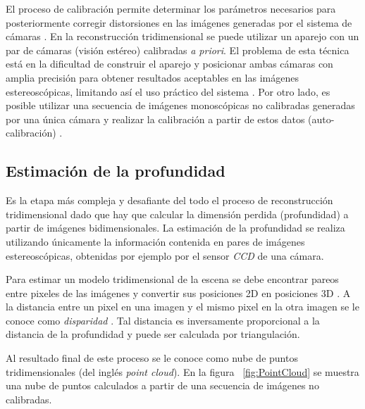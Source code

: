 El proceso de calibraci\'{o}n permite determinar los par\'{a}metros necesarios para posteriormente corregir distorsiones en las im\'{a}genes generadas por el sistema de c\'{a}maras \cite{Bradski_Kaehler_2008,Shah_1983,Szeliski_2010, Tsai_R_Y_1987}. En la reconstrucci\'{o}n tridimensional se puede utilizar un aparejo con un par de c\'{a}maras (visi\'{o}n est\'{e}reo) calibradas \textit{a priori}. El problema de esta t\'{e}cnica est\'{a} en la dificultad de construir el aparejo y posicionar ambas c\'{a}maras con amplia precisi\'{o}n para obtener resultados aceptables en las im\'{a}genes estereosc\'{o}picas, limitando as\'{i} el uso pr\'{a}ctico del sistema \cite{Faugeras_Toscani_1986, Faugeras_Luong_2001, Faugeras_1993}. Por otro lado, es posible utilizar una secuencia de im\'{a}genes monosc\'{o}picas no calibradas generadas por una \'{u}nica c\'{a}mara y realizar la calibraci\'{o}n a partir de estos datos (auto-calibraci\'{o}n) \cite{Maybank_Faugeras_1992,Hartley_1993,Werner_Zisserman_2002,Hartley_Zisserman_2003}.

\subsection{Estimaci\'{o}n de la profundidad}
Es la etapa m\'{a}s compleja y desafiante del todo el proceso de reconstrucci\'{o}n tridimensional dado que hay que calcular la dimensi\'{o}n perdida (profundidad) a partir de im\'{a}genes bidimensionales. La estimaci\'{o}n de la profundidad se realiza utilizando \'{u}nicamente la informaci\'{o}n contenida en pares de im\'{a}genes es\-te\-reos\-c\'{o}pi\-cas, obtenidas por ejemplo por el sensor \emph{\ac{CCD}} de una c\'{a}mara.

Para estimar un modelo tridimensional de la escena se debe encontrar pareos entre pixeles de las im\'{a}genes y convertir sus posiciones 2D en posiciones 3D \cite{Cyganek_Siebert_2009, Szeliski_2010,Shah_1983}. A la distancia entre un pixel en una imagen y el mismo pixel en la otra imagen se le conoce como \emph{disparidad} \cite{Cyganek_Siebert_2009,Forsyth_Ponce_2002,Shah_1983}. Tal distancia es inversamente proporcional a la distancia de la profundidad y puede ser calculada por triangulaci\'{o}n.

Al resultado final de este proceso se le conoce como nube de puntos tridimensionales (del ingl\'{e}s \textit{point cloud}). En la figura ~\ref{fig:PointCloud} se muestra una nube de puntos calculados a partir de una secuencia de im\'{a}genes no calibradas.

